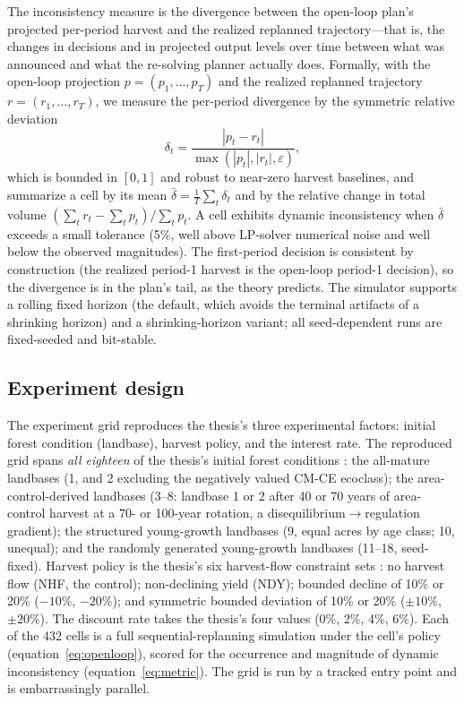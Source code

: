 \documentclass[12pt]{article}
\begin{document}
The inconsistency measure is the divergence between the open-loop plan's projected per-period harvest and the realized replanned trajectory---that is, the changes in decisions and in projected output levels over time between what was announced and what the re-solving planner actually does. Formally, with the open-loop projection \(p = (p_1, \ldots, p_T)\) and the realized replanned trajectory \(r = (r_1, \ldots, r_T)\), we measure the per-period divergence by the symmetric relative deviation
\begin{equation}
\delta_t = \frac{|p_t - r_t|}{\max(|p_t|, |r_t|, \varepsilon)},
\label{eq:metric}
\end{equation}
which is bounded in \([0, 1]\) and robust to near-zero harvest baselines, and summarize a cell by its mean \(\bar\delta = \frac{1}{T}\sum_t \delta_t\) and by the relative change in total volume \((\sum_t r_t - \sum_t p_t)/\sum_t p_t\). A cell exhibits dynamic inconsistency when \(\bar\delta\) exceeds a small tolerance (5\%, well above LP-solver numerical noise and well below the observed magnitudes). The first-period decision is consistent by construction (the realized period-1 harvest is the open-loop period-1 decision), so the divergence is in the plan's tail, as the theory predicts. The simulator supports a rolling fixed horizon (the default, which avoids the terminal artifacts of a shrinking horizon) and a shrinking-horizon variant; all seed-dependent runs are fixed-seeded and bit-stable.

\hypertarget{experiment-design}{%
\subsection{Experiment design}\label{experiment-design}}

The experiment grid reproduces the thesis's three experimental factors: initial forest condition (landbase), harvest policy, and the interest rate. The reproduced grid spans \emph{all eighteen} of the thesis's initial forest conditions \citep[Table~5.5]{daugherty1991credibility}: the all-mature landbases (1, and 2 excluding the negatively valued CM-CE ecoclass); the area-control-derived landbases (3--8: landbase 1 or 2 after 40 or 70 years of area-control harvest at a 70- or 100-year rotation, a disequilibrium\(\to\)regulation gradient); the structured young-growth landbases (9, equal acres by age class; 10, unequal); and the randomly generated young-growth landbases (11--18, seed-fixed). Harvest policy is the thesis's six harvest-flow constraint sets \citep[Table~5.6]{daugherty1991credibility}: no harvest flow (NHF, the control); non-declining yield (NDY); bounded decline of 10\% or 20\% (\(-10\%\), \(-20\%\)); and symmetric bounded deviation of 10\% or 20\% (\(\pm10\%\), \(\pm20\%\)). The discount rate takes the thesis's four values (0\%, 2\%, 4\%, 6\%). Each of the 432 cells is a full sequential-replanning simulation under the cell's policy (equation~\eqref{eq:openloop}), scored for the occurrence and magnitude of dynamic inconsistency (equation~\eqref{eq:metric}). The grid is run by a tracked entry point and is embarrassingly parallel.
\end{document}
